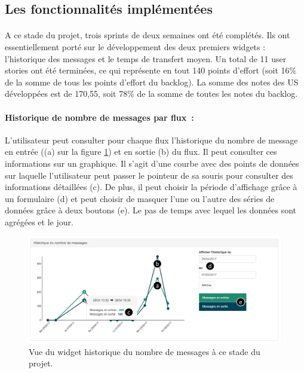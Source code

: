 		\subsection{Les fonctionnalités implémentées}
			\paragraph{}%
			A ce stade du projet, trois sprints de deux semaines ont été complétés. Ils
			ont essentiellement porté sur le développement des deux premiers widgets :
			l'historique des messages et le temps de transfert moyen. Un total de 11 user
			stories ont été terminées, ce qui représente en tout 140 points d'effort
			(soit 16\% de la somme de tous les points d'effort du backlog). La somme des
			notes des US développées est de 170,55, soit 78\% de la somme de toutes
			les notes du backlog.
		
			\paragraph{Historique de nombre de messages par flux~: }
			L'utilisateur peut consulter pour chaque flux l'historique du nombre de
			message en entrée ((a) sur la figure \ref{vue_history}) et en sortie (b) du
			flux. Il peut consulter ces informations sur un graphique. Il s'agit d'une
			courbe avec des points de données sur laquelle l'utilisateur peut passer le
			pointeur de sa souris pour consulter des informations détaillées (c). De
			plus, il peut choisir la période d'affichage grâce à un formulaire (d) et
			peut choisir de masquer l'une ou l'autre des séries de données grâce à deux
			boutons (e). Le pas de temps avec lequel les données sont agrégées et le jour.
			\begin{figure}[H]
				\centering
				\includegraphics[width=16cm]{../img/part3/vue_history.png}
				\caption{\label{vue_history} Vue du widget historique du nombre de messages
				à ce stade du projet.}
			\end{figure}
			
